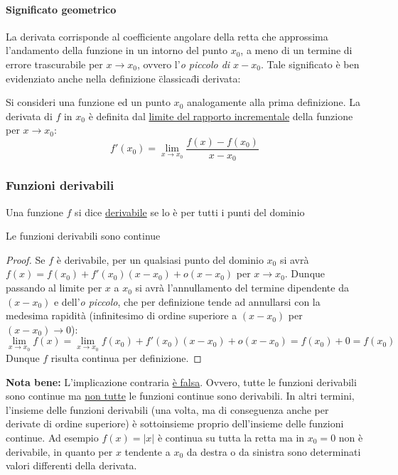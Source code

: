 \documentclass[10pt]{article}
\theoremstyle{plain}
\begin{document}
\paragraph{Significato geometrico} 
La derivata corrisponde al coefficiente angolare della retta che approssima l'andamento della funzione in un intorno del punto $x_0$, a meno di un termine di errore trascurabile per $x \rightarrow x_0$, ovvero l'\textit{o piccolo di $x - x_0$}.
Tale significato è ben evidenziato anche nella definizione \"classica\" di derivata:
\begin{defin} Si consideri una funzione ed un punto $x_0$ analogamente alla prima definizione. La derivata di $f$ in $x_0$ è definita dal \underline{limite del rapporto incrementale} della funzione per $x \rightarrow x_0$:
\[f'(x_0) = \lim \limits_{x \rightarrow x_0} \frac{f(x) - f(x_0)}{x - x_0}\]
\end{defin}

\subsubsection{Funzioni derivabili}
\label{subsubsec:derivabili}
\begin{defin}
Una funzione $f$ si dice \underline{derivabile} se lo è per tutti i punti del dominio
\end{defin}
\begin{prop}
Le funzioni derivabili sono continue
\end{prop}
\begin{proof}
Se $f$ è derivabile, per un qualsiasi punto del dominio $x_0$ si avrà $f(x) = f(x_0) + f'(x_0) (x - x_0) + o (x- x_0)$ per $x \rightarrow x_0$. Dunque passando al limite per $x$ a $x_0$ si avrà l'annullamento del termine dipendente da $(x-x_0)$ e dell'\textit{o piccolo}, che per definizione tende ad annullarsi con la medesima rapidità (infinitesimo di ordine superiore a $(x - x_0)$ per $(x - x_0) \rightarrow 0$):
\[\lim \limits_{x \rightarrow x_0} f(x) = \lim \limits_{x \rightarrow x_0} f(x_0) + f'(x_0) (x - x_0) + o (x- x_0) = f(x_0) + 0 = f(x_0)\]
Dunque $f$ risulta continua per definizione.
\end{proof}
\textbf{Nota bene:} L'implicazione contraria \underline{è falsa}. Ovvero, tutte le funzioni derivabili sono continue ma \underline{non tutte} le funzioni continue sono derivabili. In altri termini, l'insieme delle funzioni derivabili (una volta, ma di conseguenza anche per derivate di ordine superiore) è sottoinsieme proprio dell'insieme delle funzioni continue.
Ad esempio $f(x) = |x|$ è continua su tutta la retta ma in $x_0 = 0$ non è derivabile, in quanto per $x$ tendente a $x_0$ da destra o da sinistra sono determinati valori differenti della derivata.
\end{document}
